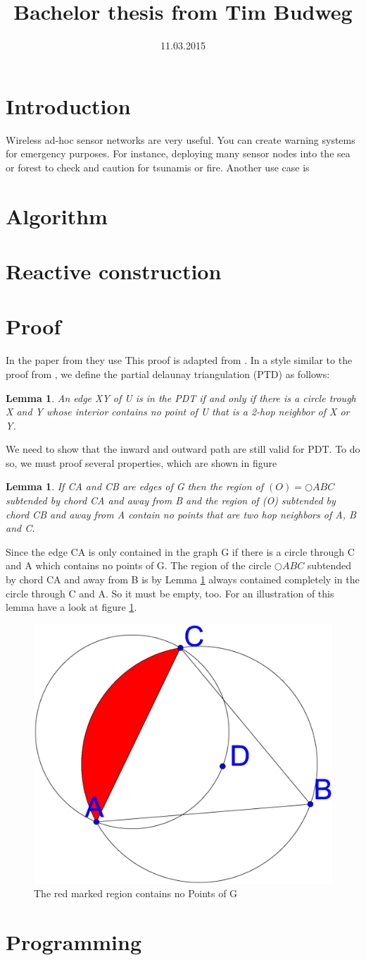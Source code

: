 \documentclass[a4paper,twoside, onecolumn]{IEEEtran}
\title{Bachelor thesis from Tim Budweg}
\author{}
\date{11.03.2015}
\newtheorem{emptycircle}{Lemma}[section]
\newtheorem{emptyregion}{Lemma}[section]
\begin{document}
\maketitle

\section{Introduction}
Wireless ad-hoc sensor networks are very useful. 
You can create warning systems for emergency purposes.
For instance, deploying many sensor nodes into the sea or forest to check and caution for tsunamis or fire.
Another use case is
\section{Algorithm}
\section{Reactive construction}
\section{Proof}
In the paper from \cite{kanj} they use 
This proof is adapted from \cite{kanj}.
In a style similar to the proof from \cite{kanj}, we define the partial delaunay triangulation (PTD) as follows:
\begin{emptycircle}
\label{emptycircle}
An edge XY of U is in the PDT if and only if there is a circle trough X and Y whose interior contains no point of U that is a 2-hop neighbor of X or Y.
\end{emptycircle}
We need to show that the inward and outward path are still valid for PDT.
To do so, we must proof several properties, which are shown in figure

\begin{emptyregion}
If CA and CB are edges of G then the region of $(O)=\bigcirc{ABC} $ subtended by chord  CA and away from B and the region of (O) subtended by chord CB and away from A contain no points that are two hop neighbors of A, B and C.
\end{emptyregion}

Since the edge CA is only contained in the graph G if there is a circle through C and A which contains no points of G.
The region of the circle $\bigcirc{ABC} $ subtended by chord CA and away from B is by Lemma \ref{emptycircle} always contained completely in the circle through C and A.
So it must be empty, too.
For an illustration of this lemma have a look at figure \ref{fig:region}.


\begin{figure}[h!]
\centering
\includegraphics[width=0.2\linewidth]{noPointinRegion.eps}
\caption{The red marked region contains no Points of G}
\label{fig:region}
\end{figure}

\section{Programming}



\end{document}
